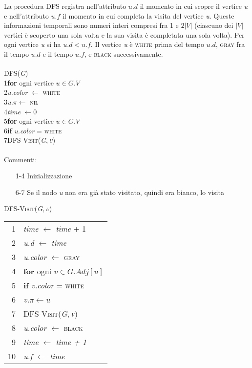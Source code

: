 \documentclass[10pt, a4paper]{report}
\newcommand\firsttab[1][0.5cm]{\hspace*{#1}}
\newcommand\secondtab[1][1cm]{\hspace*{#1}}
\newcommand\thirdtab[1][1.5cm]{\hspace*{#1}}
\begin{document}
La procedura \textsc{DFS} registra nell'attributo $u.d$ il momento in cui scopre il vertice \textit{u} e nell'attributo $u.f$ il momento in cui completa la visita del vertice \textit{u}. Queste informazioni temporali sono numeri interi compresi fra 1 e $2|V|$ (ciascuno dei $|V|$ vertici è scoperto una sola volta e la sua visita è completata una sola volta). Per ogni vertice \textit{u} si ha $u.d < u.f$. Il vertice \textit{u} è \textsc{white} prima del tempo $u.d$, \textsc{gray} fra il tempo $u.d$ e il tempo $u.f$, e \textsc{black} successivamente.\\\\
\textsc{DFS(\textit{G})}\\
1\firsttab\textbf{for} ogni vertice $u \in G.V$\\
2\secondtab\textit{u.color} $\leftarrow$ \textsc{white}\\
3\secondtab\textit{u.}$\pi \leftarrow$ \textsc{nil}\\
4\firsttab\textit{time} $\leftarrow 0$\\
5\firsttab\textbf{for} ogni vertice $u \in G.V$\\
6\secondtab\textbf{if} \textit{u.color} = \textsc{white}\\
7\thirdtab\textsc{DFS-Visit(\textit{G},\,\textit{u})}\\\\
Commenti:
\begin{enumerate}
\item[1-4]Inizializzazione
\item[6-7]Se il nodo \textit{u} non era già stato visitato, quindi era bianco, lo visita
\end{enumerate}
\textsc{DFS-Visit(\textit{G},\,\textit{u})}\\
\begin{tabular}{rl}
1&\textit{time} $\leftarrow$ \textit{time} + 1\\
2&\textit{u.d} $\leftarrow$ \textit{time}\\
3&\textit{u.color} $\leftarrow$ \textsc{gray}\\
4&\textbf{for} ogni $v \in G.Adj[u]$\\
5&\firsttab\textbf{if} \textit{v.color} = \textsc{white}\\
6&\secondtab\textit{v.}$\pi \leftarrow u$\\
7&\secondtab\textsc{DFS-Visit(\textit{G},\,\textit{v})}\\
8&\textit{u.color} $\leftarrow$ \textsc{black}\\
9&\textit{time} $\leftarrow$ \textit{time + 1}\\
10&\textit{u.f} $\leftarrow$ \textit{time}
\end{tabular}\\\\
\end{document}
